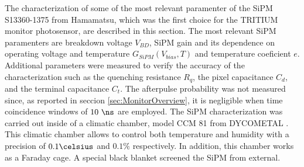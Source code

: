 The characterization of some of the most relevant paramenter of the SiPM S13360-1375 from Hamamatsu, which was the first choice for the TRITIUM monitor photosensor, are described in this section. The most relevant SiPM paramenters are breakdown voltage $V_{BD}$, SiPM gain and its dependence on operating voltage and temperature $G_{SiPM}(V_{bias}, T)$ and temperature coeficient $e$. Additional parameters were measured to verify the accuracy of the characterization such as the quenching resistance $R_q$, the pixel capacitance $C_d$, and the terminal capacitance $C_t$. The afterpulse probability was not measured since, as reported in seccion \ref{sec:MonitorOverview}, it is negligible when time coincidence windows of $10~\ns$ are employed. The SiPM characterization was carried out inside of a climatic chamber, model CCM 81 from DYCOMETAL \cite{ClimaticChamberIFIMED}. This climatic chamber allows to control both temperature and humidity with a precision of $0.1\celsius$ and $0.1\%$ respectively. In addition, this chamber works as a Faraday cage. A special black blanket \cite{BlackBlancket} screened the SiPM from external. 

